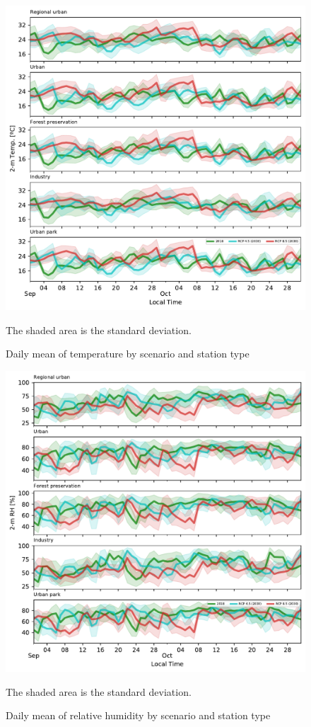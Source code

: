 \begin{figure}[hbt]
  \includegraphics[width=1\textwidth]{fig/tc_change.pdf}
  \caption{Daily mean of temperature by scenario and station type}
  {\scriptsize The shaded area is the standard deviation.}
  \label{fig:tc_change}
\end{figure}

\begin{figure}[hbt]
  \includegraphics[width=1\textwidth]{fig/rh_change.pdf}
  \caption{Daily mean of relative humidity by scenario and station type}
  {\scriptsize The shaded area is the standard deviation.}
  \label{fig:rh_change}
\end{figure}

